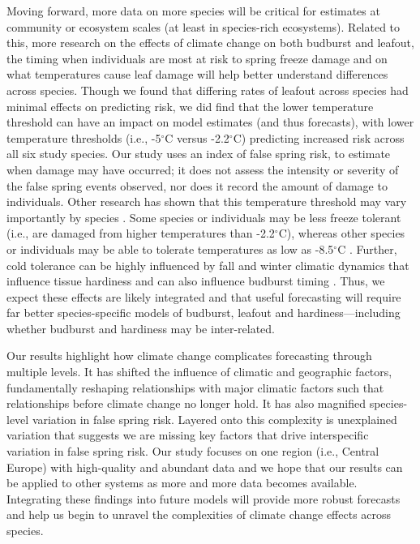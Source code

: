 \documentclass{article}\usepackage[]{graphicx}\usepackage[]{color}
\begin{document}
Moving forward, more data on more species will be critical for estimates at community or ecosystem scales (at least in species-rich ecosystems). Related to this, more research on the effects of climate change on both budburst and leafout, the timing when individuals are most at risk to spring freeze damage \citep{Chamberlain2019,Lenz2016} and on what temperatures cause leaf damage will help better understand differences across species. Though we found that differing rates of leafout across species had minimal effects on predicting risk, we did find that the lower temperature threshold can have an impact on model estimates (and thus forecasts), with lower temperature thresholds (i.e., -5$^{\circ}$C versus -2.2$^{\circ}$C) predicting increased risk across all six study species. Our study uses an index of false spring risk, to estimate when damage may have occurred; it does not assess the intensity or severity of the false spring events observed, nor does it record the amount of damage to individuals. Other research has shown that this temperature threshold may vary importantly by species \citep{Korner2016, Lenz2013, Zhuo2018,bennett2018globtherm}. Some species or individuals may be less freeze tolerant (i.e., are damaged from higher temperatures than -2.2$^{\circ}$C), whereas other species or individuals may be able to tolerate temperatures as low as -8.5$^{\circ}$C \citep{Lenz2016}. Further, cold tolerance can be highly influenced by fall and winter climatic dynamics that influence tissue hardiness \citep{Hofmann2015, Vitasse2014, Charrier2011} and can also influence budburst timing \citep{Morin2007}. Thus, we expect these effects are likely integrated and that useful forecasting will require far better species-specific models of budburst, leafout and hardiness---including whether budburst and hardiness may be inter-related. 

Our results highlight how climate change complicates forecasting through multiple levels. It has shifted the influence of climatic and geographic factors, fundamentally reshaping relationships with major climatic factors such that relationships before climate change no longer hold. It has also magnified species-level variation in false spring risk. Layered onto this complexity is unexplained variation that suggests we are missing key factors that drive interspecific variation in false spring risk. Our study focuses on one region (i.e., Central Europe) with high-quality and abundant data and we hope that our results can be applied to other systems as more and more data becomes available. Integrating these findings into future models will provide more robust forecasts and help us begin to unravel the complexities of climate change effects across species.
\end{document}

